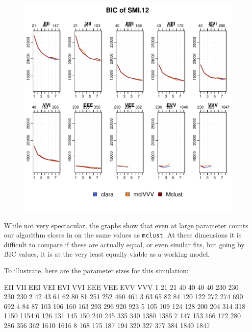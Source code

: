 \begin{figure}[h!]
    \begin{Rgraph}[0.9]
\includegraphics{chapter3-2smiplot}
    \end{Rgraph}
\end{figure}

While not very spectacular, the graphs show that even at large parameter
counts our algorithm closes in on the same values as {\tt mclust}.
At these dimensions it is difficult to compare if these are actually 
equal, or even similar fits, but going by BIC values, it is at the very 
least equally viable as a working model.

To illustrate, here are the parameter sizes for this simulation:
\begin{Schunk}
\begin{Soutput}
  EII VII EEI VEI EVI VVI EEE VEE  EVV  VVV
1  21  21  40  40  40  40 230 230  230  230
2  42  43  61  62  80  81 251 252  460  461
3  63  65  82  84 120 122 272 274  690  692
4  84  87 103 106 160 163 293 296  920  923
5 105 109 124 128 200 204 314 318 1150 1154
6 126 131 145 150 240 245 335 340 1380 1385
7 147 153 166 172 280 286 356 362 1610 1616
8 168 175 187 194 320 327 377 384 1840 1847
\end{Soutput}
\end{Schunk}




